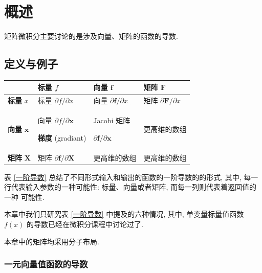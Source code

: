 \documentclass[10pt,UTF8]{book} %
\begin{document}
\makeatletter
\let\ps@plain\ps@empty
\makeatother

\mainmatter
\chapter{概述}

矩阵微积分主要讨论的是涉及向量、矩阵的函数的导数.

\section{定义与例子}


{ %
\label{一阶导数} %
\begin{longtable}{p{6em}p{8em}p{8em}p{8em}}
    \hline
    & \textbf{标量} $f$ & \textbf{向量} $\boldsymbol{f}$ & \textbf{矩阵} $\boldsymbol{F}$ \\
    \hline
    \endhead
    \hline
    \endfoot

    \textbf{标量} $x$ & 标量 $\partial f / \partial x$ 
    & 向量 $\partial \boldsymbol{f} / \partial x$ 
    & 矩阵 $\partial \boldsymbol{F} / \partial x$ \\ 
    \textbf{向量} $\boldsymbol{x}$ & 向量 $\partial f / \partial \boldsymbol{x}$
    
    \textbf{梯度} (gradiant) & Jacobi 矩阵
    
    $\partial \boldsymbol{f} / \partial \boldsymbol{x}$& 更高维的数组 \\ 
    \textbf{矩阵} $\boldsymbol{X}$ & 矩阵 $\partial \boldsymbol{f} / \partial \boldsymbol{X}$ & 更高维的数组 & 更高维的数组 \\
\end{longtable}}

表 \ref{一阶导数} 总结了不同形式输入和输出的函数的一阶导数的的形式, 其中,
每一行代表输入参数的一种可能性: 标量、向量或者矩阵, 而每一列则代表着返回值的一种
可能性.

本章中我们只研究表 \ref{一阶导数} 中提及的六种情况, 其中, 单变量标量值函数
$f(x)$ 的导数已经在微积分课程中讨论过了.

本章中的矩阵均采用分子布局.

\subsection{一元向量值函数的导数}
\end{document}
